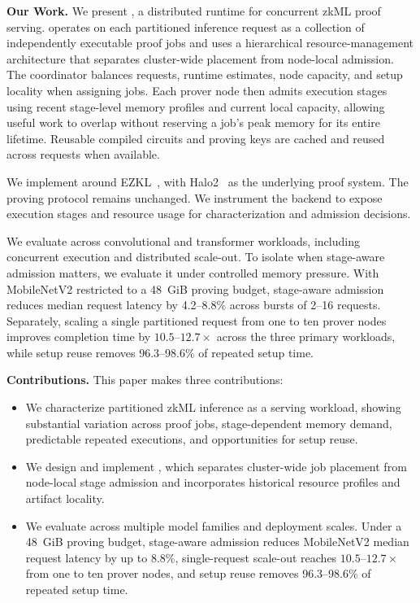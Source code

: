 \textbf{Our Work.}
We present \TITLE{}, a distributed runtime for concurrent zkML proof serving. \TITLE{} operates on each partitioned inference request as a collection of independently executable proof jobs and uses a hierarchical resource-management architecture that separates cluster-wide placement from node-local admission. The coordinator balances requests, runtime estimates, node capacity, and setup locality when assigning jobs. Each prover node then admits execution stages using recent stage-level memory profiles and current local capacity, allowing useful work to overlap without reserving a job's peak memory for its entire lifetime. Reusable compiled circuits and proving keys are cached and reused across requests when available.

We implement \TITLE{} around EZKL~\cite{ezkl}, with Halo2~\cite{halo2} as the underlying proof system. The proving protocol remains unchanged. We instrument the backend to expose execution stages and resource usage for characterization and admission decisions.

We evaluate \TITLE{} across convolutional and transformer workloads, including concurrent execution and distributed scale-out. To isolate when stage-aware admission matters, we evaluate it under controlled memory pressure. With MobileNetV2 restricted to a 48~GiB proving budget, stage-aware admission reduces median request latency by 4.2--8.8\% across bursts of 2--16 requests. Separately, scaling a single partitioned request from one to ten prover nodes improves completion time by \(10.5\)--\(12.7\times\) across the three primary workloads, while setup reuse removes 96.3--98.6\% of repeated setup time.

\textbf{Contributions.} This paper makes three contributions:
\begin{itemize}
    \item We characterize partitioned zkML inference as a serving workload, showing substantial variation across proof jobs, stage-dependent memory demand, predictable repeated executions, and opportunities for setup reuse.
    \item We design and implement \TITLE{}, which separates cluster-wide job placement from node-local stage admission and incorporates historical resource profiles and artifact locality.
    \item We evaluate \TITLE{} across multiple model families and deployment scales. Under a 48~GiB proving budget, stage-aware admission reduces MobileNetV2 median request latency by up to 8.8\%, single-request scale-out reaches \(10.5\)--\(12.7\times\) from one to ten prover nodes, and setup reuse removes 96.3--98.6\% of repeated setup time.
\end{itemize}
